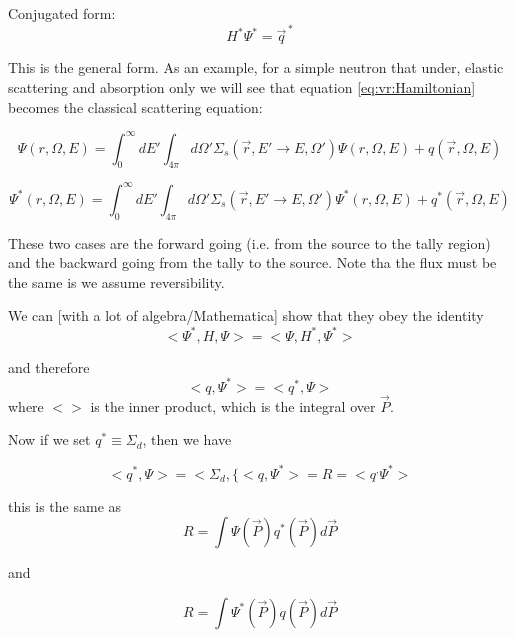 Conjugated form:
\begin{equation}
  H^* \Psi^*  =  \vec{q}^{\,*} 
\end{equation}

This is the general form. As an example, for a simple neutron that under, elastic scattering and absorption only we will see that equation \ref{eq:vr:Hamiltonian} becomes the classical  scattering equation:

\begin{equation}
  [\Omega \cdot \Delta + \Sigma_t(\vec{r},E)] \Psi(r,\Omega,E) = \int^\infty_0 dE' \int_{4\pi}
  d\Omega' \Sigma_s(\vec{r},E' \rightarrow E,\Omega') \Psi(r,\Omega,E) + q(\vec{r},\Omega,E)
\end{equation}

\begin{equation}
  [-\Omega \cdot \Delta + \Sigma_t(\vec{r},E)] \Psi^*(r,\Omega,E) = \int^\infty_0 dE' \int_{4\pi}
  d\Omega' \Sigma_s(\vec{r},E' \rightarrow E,\Omega') \Psi^*(r,\Omega,E) + q^*(\vec{r},\Omega,E)
\end{equation}

These two cases are the forward going (i.e. from the source to the tally region) and the backward going from the
tally to the source. Note tha the flux must be the same is we assume reversibility.

We can [with a lot of algebra/Mathematica] show that they obey the identity
\begin{equation}
  < \Psi^*,H,\Psi >  =  <\Psi, H^*, \Psi^*> 
\end{equation}

and therefore 
\begin{equation}
  < q,\Psi^* >  =  <q^*,\Psi> 
\end{equation}
where $< >$ is the inner product, which is the integral over $\vec{P}$.

Now if we set $q^* \equiv \Sigma_d$, then we have

\begin{equation}
<q^*,\Psi>  = <\Sigma_d,\{< q,\Psi^* >  =  R = <q^,\Psi^*> 
\end{equation}

this is the same as
\begin{equation*}
  R = \int \Psi(\vec{P}) q^*(\vec{P}) d\vec{P}
\end{equation*}

and

\begin{equation*}
  R = \int \Psi^*(\vec{P}) q(\vec{P}) d\vec{P}
\end{equation*}

